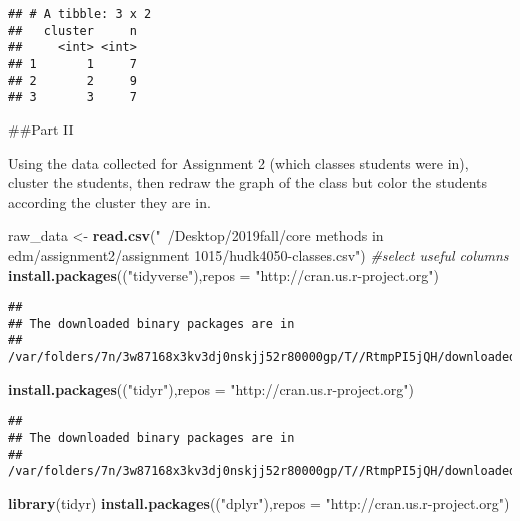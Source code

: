 \documentclass[]{article}
\newenvironment{Shaded}{\begin{snugshade}}{\end{snugshade}}
\newcommand{\CommentTok}[1]{\textcolor[rgb]{0.56,0.35,0.01}{\textit{#1}}}
\newcommand{\DataTypeTok}[1]{\textcolor[rgb]{0.13,0.29,0.53}{#1}}
\newcommand{\KeywordTok}[1]{\textcolor[rgb]{0.13,0.29,0.53}{\textbf{#1}}}
\newcommand{\NormalTok}[1]{#1}
\newcommand{\StringTok}[1]{\textcolor[rgb]{0.31,0.60,0.02}{#1}}
\begin{document}
\begin{verbatim}
## # A tibble: 3 x 2
##   cluster     n
##     <int> <int>
## 1       1     7
## 2       2     9
## 3       3     7
\end{verbatim}

\#\#Part II

Using the data collected for Assignment 2 (which classes students were
in), cluster the students, then redraw the graph of the class but color
the students according the cluster they are in.

\begin{Shaded}
\begin{Highlighting}[]
\NormalTok{raw_data <-}\StringTok{ }\KeywordTok{read.csv}\NormalTok{(}\StringTok{"~/Desktop/2019fall/core methods in edm/assignment2/assignment 1015/hudk4050-classes.csv"}\NormalTok{)}
\CommentTok{#select useful columns}
\KeywordTok{install.packages}\NormalTok{((}\StringTok{"tidyverse"}\NormalTok{),}\DataTypeTok{repos =} \StringTok{"http://cran.us.r-project.org"}\NormalTok{)}
\end{Highlighting}
\end{Shaded}

\begin{verbatim}
## 
## The downloaded binary packages are in
##  /var/folders/7n/3w87168x3kv3dj0nskjj52r80000gp/T//RtmpPI5jQH/downloaded_packages
\end{verbatim}

\begin{Shaded}
\begin{Highlighting}[]
\KeywordTok{install.packages}\NormalTok{((}\StringTok{"tidyr"}\NormalTok{),}\DataTypeTok{repos =} \StringTok{"http://cran.us.r-project.org"}\NormalTok{)}
\end{Highlighting}
\end{Shaded}

\begin{verbatim}
## 
## The downloaded binary packages are in
##  /var/folders/7n/3w87168x3kv3dj0nskjj52r80000gp/T//RtmpPI5jQH/downloaded_packages
\end{verbatim}

\begin{Shaded}
\begin{Highlighting}[]
\KeywordTok{library}\NormalTok{(tidyr)}
\KeywordTok{install.packages}\NormalTok{((}\StringTok{"dplyr"}\NormalTok{),}\DataTypeTok{repos =} \StringTok{"http://cran.us.r-project.org"}\NormalTok{)}
\end{Highlighting}
\end{Shaded}
\end{document}
